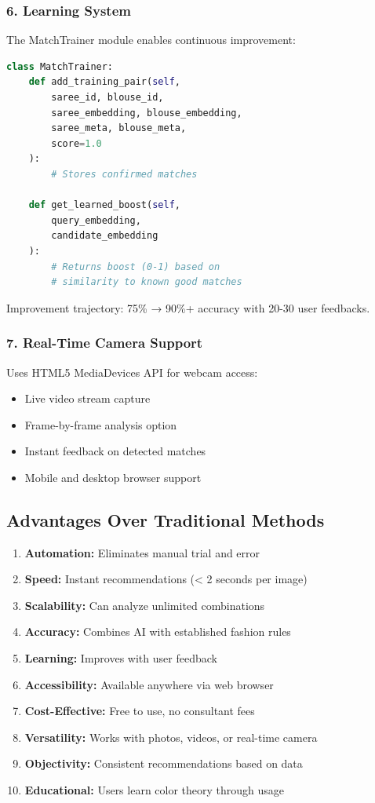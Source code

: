 \documentclass[12pt,a4paper]{report}
\begin{document}
\subsubsection{6. Learning System}

The MatchTrainer module enables continuous improvement:

\begin{lstlisting}[language=Python]
class MatchTrainer:
    def add_training_pair(self, 
        saree_id, blouse_id,
        saree_embedding, blouse_embedding,
        saree_meta, blouse_meta, 
        score=1.0
    ):
        # Stores confirmed matches
        
    def get_learned_boost(self,
        query_embedding, 
        candidate_embedding
    ):
        # Returns boost (0-1) based on 
        # similarity to known good matches
\end{lstlisting}

Improvement trajectory: 75\% → 90\%+ accuracy with 20-30 user feedbacks.

\subsubsection{7. Real-Time Camera Support}

Uses HTML5 MediaDevices API for webcam access:
\begin{itemize}
    \item Live video stream capture
    \item Frame-by-frame analysis option
    \item Instant feedback on detected matches
    \item Mobile and desktop browser support
\end{itemize}

\subsection{Advantages Over Traditional Methods}

\begin{enumerate}
    \item \textbf{Automation:} Eliminates manual trial and error
    \item \textbf{Speed:} Instant recommendations (< 2 seconds per image)
    \item \textbf{Scalability:} Can analyze unlimited combinations
    \item \textbf{Accuracy:} Combines AI with established fashion rules
    \item \textbf{Learning:} Improves with user feedback
    \item \textbf{Accessibility:} Available anywhere via web browser
    \item \textbf{Cost-Effective:} Free to use, no consultant fees
    \item \textbf{Versatility:} Works with photos, videos, or real-time camera
    \item \textbf{Objectivity:} Consistent recommendations based on data
    \item \textbf{Educational:} Users learn color theory through usage
\end{enumerate}
\end{document}
